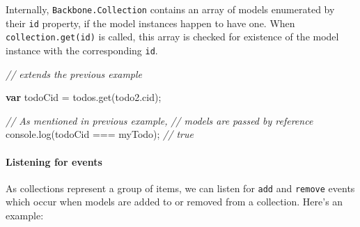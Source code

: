 \documentclass[9pt]{book}
\newenvironment{Shaded}{}{}
\newcommand{\KeywordTok}[1]{\textcolor[rgb]{0.00,0.44,0.13}{\textbf{{#1}}}}
\newcommand{\CommentTok}[1]{\textcolor[rgb]{0.38,0.63,0.69}{\textit{{#1}}}}
\newcommand{\OtherTok}[1]{\textcolor[rgb]{0.00,0.44,0.13}{{#1}}}
\newcommand{\FunctionTok}[1]{\textcolor[rgb]{0.02,0.16,0.49}{{#1}}}
\newcommand{\NormalTok}[1]{{#1}}
\begin{document}
Internally, \texttt{Backbone.Collection} contains an array of models
enumerated by their \texttt{id} property, if the model instances happen
to have one. When \texttt{collection.get(id)} is called, this array is
checked for existence of the model instance with the corresponding
\texttt{id}.

\begin{Shaded}
\begin{Highlighting}[]
\CommentTok{// extends the previous example}

\KeywordTok{var} \NormalTok{todoCid = }\OtherTok{todos}\NormalTok{.}\FunctionTok{get}\NormalTok{(}\OtherTok{todo2}\NormalTok{.}\FunctionTok{cid}\NormalTok{);}

\CommentTok{// As mentioned in previous example, }
\CommentTok{// models are passed by reference}
\OtherTok{console}\NormalTok{.}\FunctionTok{log}\NormalTok{(todoCid === myTodo); }\CommentTok{// true}
\end{Highlighting}
\end{Shaded}

\paragraph{Listening for events}\label{listening-for-events}

As collections represent a group of items, we can listen for
\texttt{add} and \texttt{remove} events which occur when models are
added to or removed from a collection. Here's an example:
\end{document}
